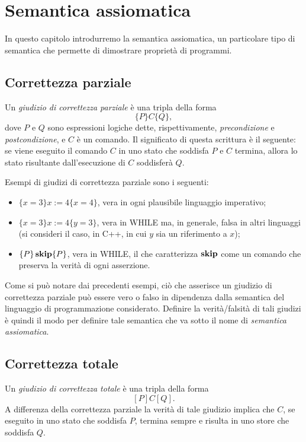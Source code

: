 \chapter{Semantica assiomatica}

In questo capitolo introdurremo la semantica assiomatica, un particolare
tipo di semantica che permette di dimostrare proprietà di programmi.

\section{Correttezza parziale}
\begin{definizione}
Un \emph{giudizio di correttezza parziale} è una tripla
della forma
\[
  \{P\} C \{Q\},
\]
dove $P$ e $Q$ sono espressioni logiche dette,
rispettivamente, \emph{precondizione} e \emph{postcondizione},
e $C$ è un comando. Il significato di questa scrittura è
il seguente: se viene eseguito il comando $C$ in uno stato che
soddisfa $P$ e $C$ termina, allora lo stato risultante dall'esecuzione di $C$
soddisferà $Q$.
\end{definizione}

Esempi di giudizi di correttezza parziale sono i seguenti:
\begin{itemize}
\item
$\{ x = 3 \} x := 4 \{ x = 4 \}$, vera in ogni plausibile linguaggio imperativo;
\item
$\{ x = 3 \} x := 4 \{ y = 3 \}$, vera in WHILE ma, in generale,
falsa in altri linguaggi (si consideri il caso, in C++, in cui $y$ sia
un riferimento a $x$);
\item
$\{ P \} \mathop{\textup{\textbf{skip}}} \{ P \}$, vera in WHILE, il che caratterizza
$\mathop{\textup{\textbf{skip}}}$ come un comando che preserva la verità di ogni asserzione.
\end{itemize}

Come si può notare dai precedenti esempi, ciò che asserisce un
giudizio di correttezza parziale può essere vero o falso
in dipendenza dalla semantica del linguaggio di programmazione
considerato.
Definire la verità/falsità di tali giudizi è quindi il modo
per definire tale semantica che va sotto il nome di
\emph{semantica assiomatica}.

\section{Correttezza totale}
\begin{definizione}
Un \emph{giudizio di correttezza totale} è una tripla della forma
\[
  [P] C [Q].
\]
A differenza della correttezza parziale la verità di tale giudizio
implica che $C$, se eseguito in uno stato che soddisfa $P$,
termina sempre e risulta in uno store che soddisfa $Q$.
\end{definizione}

